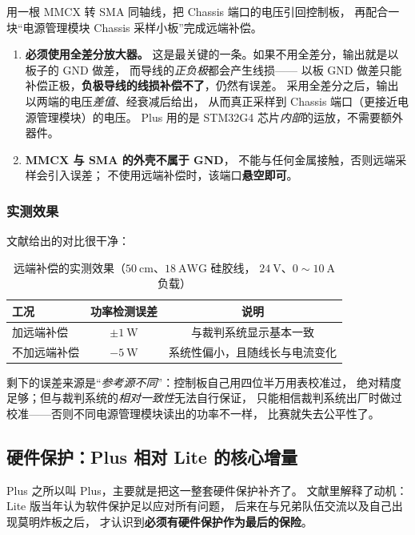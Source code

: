 \documentclass[cn,blue,11pt,device=normal]{elegantnote}
\begin{document}
用一根 MMCX 转 SMA 同轴线，把 Chassis 端口的电压引回控制板，
再配合一块“电源管理模块 Chassis 采样小板”完成远端补偿。

\begin{enumerate}
  \item \textbf{必须使用全差分放大器。}
  这是最关键的一条。如果不用全差分，输出就是以板子的 GND 做差，
  而导线的\emph{正负极}都会产生线损——
  以板 GND 做差只能补偿正极，\textbf{负极导线的线损补偿不了}，仍然有误差。
  采用全差分之后，输出以两端的电压\emph{差值}、经衰减后给出，
  从而真正采样到 Chassis 端口（更接近电源管理模块）的电压。
  Plus 用的是 STM32G4 芯片\emph{内部}的运放，不需要额外器件。
  \item \textbf{MMCX 与 SMA 的外壳不属于 GND}，
  不能与任何金属接触，否则远端采样会引入误差；
  不使用远端补偿时，该端口\textbf{悬空即可}。
\end{enumerate}

\subsubsection{实测效果}

文献给出的对比很干净：

\begin{table}[htbp]
  \centering
  \small
  \caption{远端补偿的实测效果（$50\ \mathrm{cm}$、$18\ \mathrm{AWG}$ 硅胶线，
  $24\ \mathrm{V}$、$0\sim10\ \mathrm{A}$ 负载）}
  \label{tab:remotesense}
  \begin{tabular}{@{}lcc@{}}
    \toprule
    工况 & 功率检测误差 & 说明 \\
    \midrule
    加远端补偿   & $\pm1\ \mathrm{W}$ & 与裁判系统显示基本一致 \\
    不加远端补偿 & $-5\ \mathrm{W}$    & 系统性偏小，且随线长与电流变化 \\
    \bottomrule
  \end{tabular}
\end{table}

剩下的误差来源是“\emph{参考源不同}”：控制板自己用四位半万用表校准过，
绝对精度足够；但与裁判系统的\emph{相对一致性}无法自行保证，
只能相信裁判系统出厂时做过校准——否则不同电源管理模块读出的功率不一样，
比赛就失去公平性了。

\subsection{硬件保护：Plus 相对 Lite 的核心增量}

Plus 之所以叫 Plus，主要就是把这一整套硬件保护补齐了。
文献里解释了动机：Lite 版当年认为软件保护足以应对所有问题，
后来在与兄弟队伍交流以及自己出现莫明炸板之后，
才认识到\textbf{必须有硬件保护作为最后的保险}。
\end{document}
